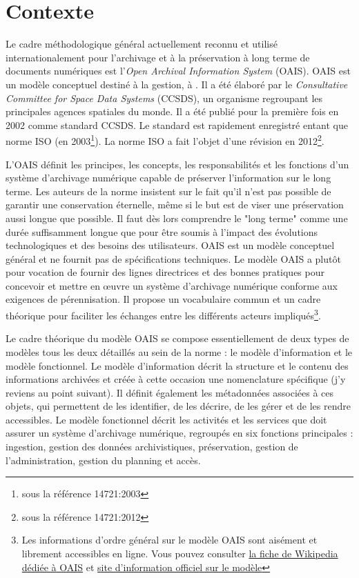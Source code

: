 \documentclass[12pt,a4paper]{article} %
\begin{document}
\section{Contexte} %
Le cadre méthodologique général actuellement reconnu et utilisé internationalement pour l'archivage et à la préservation à long terme de documents numériques est l'\textit{Open Archival Information System} (OAIS). OAIS est un modèle conceptuel destiné à la gestion, à . Il a été élaboré par le \textit{Consultative Committee for Space Data Systems} (CCSDS), un organisme regroupant les principales agences spatiales du monde. Il a été publié pour la première fois en 2002 comme standard CCSDS. Le standard est rapidement enregistré entant que norme ISO (en 2003\footnote{sous la référence 14721:2003}). La norme ISO a fait l'objet d'une révision en 2012\footnote{sous la référence 14721:2012}.

L'OAIS définit les principes, les concepts, les responsabilités et les fonctions d'un système d'archivage numérique capable de préserver l'information sur le long terme. Les auteurs de la norme insistent sur le fait qu'il n'est pas possible de garantir une conservation éternelle, même si le but est de viser une préservation aussi longue que possible. Il faut dès lors comprendre le "long terme" comme une durée suffisamment longue que pour être soumis à l'impact des évolutions technologiques et des besoins des utilisateurs. OAIS est un modèle conceptuel général et ne fournit pas de spécifications techniques. Le modèle OAIS a plutôt pour vocation de fournir des lignes directrices et des bonnes pratiques pour concevoir et mettre en œuvre un système d'archivage numérique conforme aux exigences de pérennisation. Il propose un vocabulaire commun et un cadre théorique pour faciliter les échanges entre les différents acteurs impliqués\footnote{Les informations d'ordre général sur le modèle OAIS sont aisément et librement accessibles en ligne. Vous pouvez consulter \href{https://www.fr.wikipedia.org/wiki/Open_Archival_Information_System}{la fiche de Wikipedia dédiée à OAIS} et \href{http://www.oais.info/}{site d'information officiel sur le modèle}}.

Le cadre théorique du modèle OAIS se compose essentiellement de deux types de modèles tous les deux détaillés au sein de la norme : le modèle d'information et le modèle fonctionnel. Le modèle d'information décrit la structure et le contenu des informations archivées et créée à cette occasion une nomenclature spécifique (j'y reviens au point suivant). Il définit également les métadonnées associées à ces objets, qui permettent de les identifier, de les décrire, de les gérer et de les rendre accessibles. Le modèle fonctionnel décrit les activités et les services que doit assurer un système d'archivage numérique, regroupés en six fonctions principales : ingestion, gestion des données archivistiques, préservation, gestion de l'administration, gestion du planning et accès.
\end{document}
